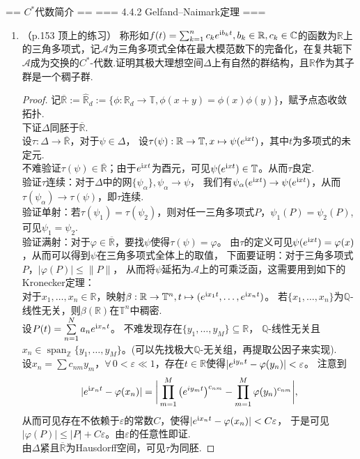 == $C^*$代数简介 ==
=== 4.4.2 Gelfand--Naimark定理 ===
\begin{enumerate}
\item[*]（p.153 顶上的练习）
称形如$f(t)=\sum_{k=1}^n c_ke^{{\rm i}b_k t},b_k\in \mathbb{R},c_k\in \mathbb{C}$的函数为$\mathbb{R}$上的三角多项式，记$\mathcal{A}$为三角多项式全体在最大模范数下的完备化，在复共轭下$\mathcal{A}$成为交换的$C^*$-代数.证明其极大理想空间$\Delta$上有自然的群结构，且$\mathbb{R}$作为其子群是一个稠子群.\\
\begin{proof}
记$\overline{\mathbb{R}}:=\widehat{\mathbb{R}}_d:=\{ \phi:\mathbb{R}_d\rightarrow {\mathbb{T}},\phi(x+y)=\phi(x)\phi(y)\}$，赋予点态收敛拓扑.\\
下证$\Delta$同胚于$\overline{\mathbb{R}}$.\\
设$\tau: \Delta\rightarrow \overline{\mathbb{R}}$，对于$\psi\in \Delta$，
设$\tau(\psi):\mathbb{R} \to \mathbb{T}, x \mapsto \psi(e^{{\rm i}xt})$，其中$t$为多项式的未定元.\\
不难验证$\tau(\psi)\in \overline{\mathbb{R}}$；由于$e^{{\rm i}xt}$为酉元，可见$\psi(e^{{\rm i}xt})\in \mathbb{T}$。从而$\tau$良定.\\
验证$\tau$连续：对于$\Delta$中的网$\{ \psi_\alpha \},\psi_\alpha\to \psi$，
我们有$\psi_\alpha(e^{{\rm i}xt})\to \psi(e^{{\rm i}xt})$，从而$\tau(\psi_\alpha)\to \tau(\psi)$，即$\tau$连续.\\
验证单射：若$\tau(\psi_1)=\tau(\psi_2)$，则对任一三角多项式$P$，$\psi_1(P)=\psi_2(P)$,可见$\psi_1=\psi_2$.\\
验证满射：对于$\varphi\in \overline{\mathbb{R}}$，要找$\psi $使得$\tau(\psi)=\varphi$。
由$\tau$的定义可见$\psi(e^{{\rm i}xt})=\varphi(x)$，从而可以得到$\psi$在三角多项式全体上的取值，
下面要证明：对于三角多项式$P$，$|\varphi(P)|\leqslant\|P\|$，
从而将$\psi$延拓为$\mathcal{A}$上的可乘泛函，这需要用到如下的Kronecker定理：\\
对于$x_1, \ldots, x_n \in \mathbb{R}$，映射$\beta:\mathbb{R}\to \mathbb{T}^n,t\mapsto (e^{{\rm i}x_1t}, \ldots ,e^{{\rm i}x_nt})$。
若$\{ x_1, \ldots ,x_n \}$为$\mathbb{Q}$-线性无关，则$\beta(\mathbb{R})$在$\mathbb{T}^n$中稠密.\\
设$P(t)=\sum\limits_{n=1}^Na_ne^{{\rm i}x_nt}$。
不难发现存在$\{ y_1, \ldots, y_M \}\subseteq \mathbb{R}$，
$\mathbb{Q}$-线性无关且$x_n\in\operatorname{span}_{\mathbb{Z}}\{ y_1, \ldots, y_M \}$。(可以先找极大$\mathbb{Q}$-无关组，再提取公因子来实现).\\
设$x_n=\sum c_{nm}y_m$，$\forall\,0<\varepsilon \ll 1$，存在$t\in \mathbb{R}$使得$|e^{{\rm i}y_nt}-\varphi(y_n)| < \varepsilon$。
注意到$$|e^{{\rm i}x_nt}-\varphi(x_n)|
=\bigg|\prod_{m=1}^{M} \big(e^{iy_mt}\big)^{c_{nm}}-\prod_{m=1}^{M}\varphi(y_n)^{c_{nm}}\bigg|,$$
从而可见存在不依赖于$\varepsilon$的常数$C$，使得$|e^{{\rm i}x_nt}-\varphi(x_n)| < C\varepsilon$，
于是可见$|\varphi(P)|\leqslant |P| +C\varepsilon$。由$\varepsilon$的任意性即证.\\
由$\Delta$紧且$\overline{\mathbb{R}}$为Hausdorff空间，可见$\tau$为同胚.
\end{proof}
\end{enumerate}

